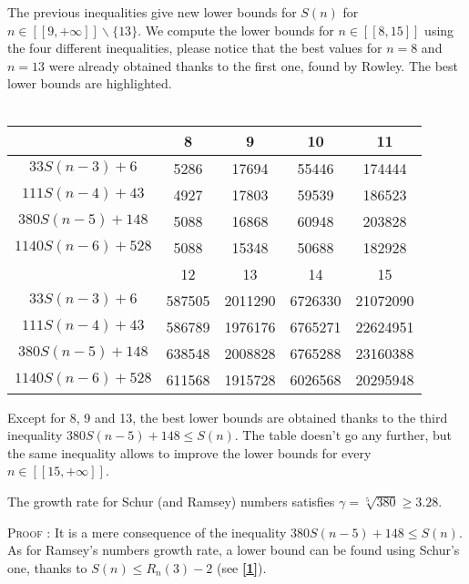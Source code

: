 The previous inequalities give new lower bounds for \(S(n)\) for
\( n \in [\![9,+\infty]\!] \backslash \{13\} \). We compute the lower
bounds for \( n \in [\![8,15]\!] \) using the four different inequalities, please notice that the best values for \( n = 8\) and \(n = 13\) were already obtained thanks to the first one, found by Rowley. The best lower bounds are highlighted.\\
\\
\begin{center}
\begin{tabular}{|*{5}{c|}}
    \hline
	 & 8 & 9 & 10 & 11 \\
	\hline
	\(33S(n-3) + 6 \) & \cellcolor{yellow} 5286 & 17694 & 55446 & 174444\\
	\hline
	\(111S(n-4) + 43 \) & 4927 & \cellcolor{yellow} 17803 & 59539 & 186523\\
	\hline
	\(380S(n-5) + 148 \) & 5088 & 16868 & \cellcolor{yellow} 60948 & \cellcolor{yellow} 203828 \\
	\hline
	\(1140S(n-6) + 528 \) & 5088 & 15348 & 50688 & 182928\\
	\hline
	\hline
	& 12 & 13 & 14 & 15 \\
	\hline
	\(33S(n-3) + 6 \) & 587505 & \cellcolor{yellow} 2011290 & 6726330 & 21072090\\
	\hline
	\(111S(n-4) + 43 \) & 586789 & 1976176 & 6765271 & 22624951 \\
	\hline
	\(380S(n-5) + 148 \) & \cellcolor{yellow} 638548 & 2008828 & \cellcolor{yellow} 6765288 & \cellcolor{yellow} 23160388 \\
	\hline
	\(1140S(n-6) + 528 \) & 611568 & 1915728 & 6026568 & 20295948 \\
	\hline
\end{tabular}
\end{center}
Except for 8, 9 and 13, the best lower bounds are obtained thanks to
the third inequality \( 380S(n-5) + 148 \leqslant S(n) \). The table
doesn't go any further, but the same inequality allows to improve the
lower bounds for every \( n \in [\![15,+\infty]\!] \). 

\begin{corollary}
The growth rate for Schur (and Ramsey) numbers satisfies \(\gamma = \sqrt[5]{380} \geqslant 3.28 \).
\end{corollary}
\textsc{Proof :} It is a mere consequence of the inequality \(380S(n-5) + 148 \leqslant S(n) \). As for Ramsey's 
numbers growth rate, a lower bound can be found using Schur's one, thanks to \(S(n) \leqslant R_n(3)-2 \) 
(see \hyperlink{label1}{\textbf{[1]}}).
